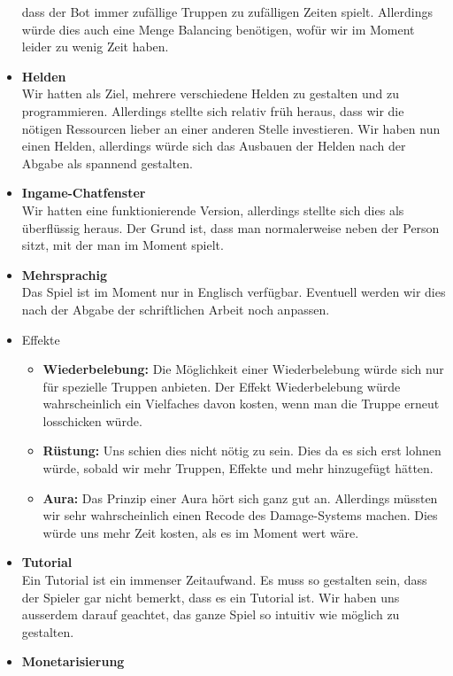\begin{itemize}
        dass der Bot immer zufällige Truppen zu zufälligen Zeiten spielt. Allerdings würde dies auch eine Menge Balancing benötigen, wofür wir im Moment leider zu wenig
        Zeit haben.
    \item \textbf{Helden} \\
        Wir hatten als Ziel, mehrere verschiedene Helden zu gestalten und zu programmieren. Allerdings stellte sich relativ früh heraus, dass wir die nötigen Ressourcen
        lieber an einer anderen Stelle investieren. Wir haben nun einen Helden, allerdings würde sich das Ausbauen der Helden nach der Abgabe als spannend gestalten.
    \item \textbf{Ingame-Chatfenster}\\
        Wir hatten eine funktionierende Version, allerdings stellte sich dies als überflüssig heraus. Der Grund ist, dass man normalerweise neben der Person sitzt,
        mit der man im Moment spielt.
    \item \textbf{Mehrsprachig} \\
        Das Spiel ist im Moment nur in Englisch verfügbar. Eventuell werden wir dies nach der Abgabe der schriftlichen Arbeit noch anpassen.
    \item Effekte
    \begin{itemize}
        \item \textbf{Wiederbelebung:}
            Die Möglichkeit einer Wiederbelebung würde sich nur für spezielle Truppen anbieten. Der Effekt Wiederbelebung würde wahrscheinlich ein Vielfaches davon kosten,
            wenn man die Truppe erneut losschicken würde. 
        \item \textbf{Rüstung:}
            Uns schien dies nicht nötig zu sein. Dies da es sich erst lohnen würde, sobald wir mehr Truppen, Effekte und mehr hinzugefügt hätten.
        \item \textbf{Aura:}
            Das Prinzip einer Aura hört sich ganz gut an. Allerdings müssten wir sehr wahrscheinlich einen Recode des Damage-Systems machen. Dies würde uns mehr Zeit kosten,
            als es im Moment wert wäre.
    \end{itemize}
    \item \textbf{Tutorial} \\
        Ein Tutorial ist ein immenser Zeitaufwand. Es muss so gestalten sein, dass der Spieler gar nicht bemerkt, dass es ein Tutorial ist. Wir haben uns ausserdem darauf 
        geachtet, das ganze Spiel so intuitiv wie möglich zu gestalten.
    \item \textbf{Monetarisierung} \\

\end{itemize}
